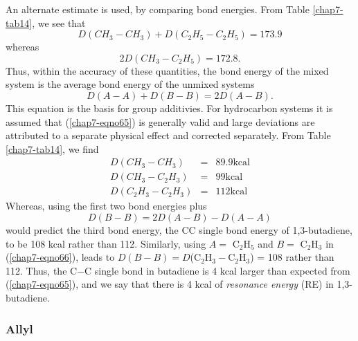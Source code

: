 An alternate estimate is used, by comparing bond energies. From 
Table \ref{chap7-tab14}, we see that
\begin{equation}
D(CH_3-CH_3) + D(C_2H_5 - C_2H_5) = 173.9
\end{equation}
whereas
\begin{equation}
2D(CH_3 - C_2H_5) = 172.8.
\end{equation}
Thus, within the accuracy of these quantities, the bond 
energy of the mixed system is the average bond energy of 
the unmixed systems
\begin{equation}
D(A-A) + D(B-B) = 2D(A-B).
\label{chap07-eqno65}
\end{equation}
This equation is the basis for group additivies.  For hydrocarbon
systems it is assumed that (\ref{chap7-eqno65}) is generally valid and
large deviations are attributed to a separate physical effect and
corrected separately.  From Table \ref{chap7-tab14}, we find
\begin{eqnarray}
D(CH_3 - CH_3) &=& 89.9 \mathrm{kcal}\\
D(CH_3 - C_2H_3) &=& 99 \mathrm{kcal}\\
D(C_2H_3 - C_2H_3) &=& 112 \mathrm{kcal}
\end{eqnarray}
Whereas, using the first two bond energies plus
\begin{equation}
D(B-B) = 2D(A-B) - D(A-A)
\label{chap07-eqno66}
\end{equation}
would predict the third bond energy, the CC single bond energy of
1,3-butadiene, to be 108 kcal rather than 112.  Similarly, using $A =$
C$_2$H$_5$ and $B =$ C$_2$H$_3$ in (\ref{chap7-eqno66}), leads to
$D(B-B) = D$(C$_2$H$_3-$C$_2$H$_3$) = 108 rather than 112.  Thus, the
C$-$C single bond in butadiene is 4 kcal larger than expected from
(\ref{chap7-eqno65}), and we say that there is 4 kcal of
\emph{resonance energy} (RE) in 1,3-butadiene.

\subsubsection{Allyl}

